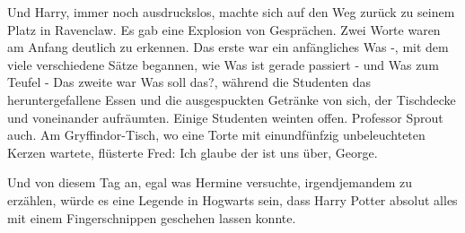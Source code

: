 Und Harry, immer noch ausdruckslos, machte sich auf den Weg zurück zu seinem
Platz in Ravenclaw. Es gab eine Explosion von Gesprächen. Zwei Worte waren am
Anfang deutlich zu erkennen. Das erste war ein anfängliches \glqq Was -\grqq{},
mit dem viele verschiedene Sätze begannen, wie \glqq Was ist gerade passiert
-\grqq{} und \glqq Was zum Teufel -\grqq{} Das zweite war \glqq Was soll
das?\grqq{}, während die Studenten das heruntergefallene Essen und die
ausgespuckten Getränke von sich, der Tischdecke und voneinander aufräumten.
Einige Studenten weinten offen. Professor Sprout auch. Am Gryffindor-Tisch, wo
eine Torte mit einundfünfzig unbeleuchteten Kerzen wartete, flüsterte Fred:
\glqq Ich glaube der ist uns über, George.\grqq{}

Und von diesem Tag an, egal was Hermine versuchte, irgendjemandem zu erzählen,
würde es eine Legende in Hogwarts sein, dass Harry Potter absolut alles mit
einem Fingerschnippen geschehen lassen konnte.